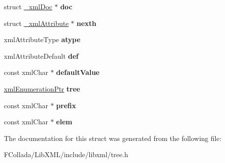 \begin{DoxyCompactItemize}
\item 
\hypertarget{struct__xmlAttribute_a9cc7df019f9b6bf88a263cddf8224351}{
struct \hyperlink{struct__xmlDoc}{\_\-xmlDoc} $\ast$ {\bfseries doc}}
\label{struct__xmlAttribute_a9cc7df019f9b6bf88a263cddf8224351}

\item 
\hypertarget{struct__xmlAttribute_ace58b06016a83e78f9030a3a734577ea}{
struct \hyperlink{struct__xmlAttribute}{\_\-xmlAttribute} $\ast$ {\bfseries nexth}}
\label{struct__xmlAttribute_ace58b06016a83e78f9030a3a734577ea}

\item 
\hypertarget{struct__xmlAttribute_ae3a8371d4d1d21b585c5d97895c3d6dd}{
xmlAttributeType {\bfseries atype}}
\label{struct__xmlAttribute_ae3a8371d4d1d21b585c5d97895c3d6dd}

\item 
\hypertarget{struct__xmlAttribute_a4e0cc0380fd2d2009bb2853e7c34423b}{
xmlAttributeDefault {\bfseries def}}
\label{struct__xmlAttribute_a4e0cc0380fd2d2009bb2853e7c34423b}

\item 
\hypertarget{struct__xmlAttribute_a1fd4cc9f458498c327f7fcc8730da01c}{
const xmlChar $\ast$ {\bfseries defaultValue}}
\label{struct__xmlAttribute_a1fd4cc9f458498c327f7fcc8730da01c}

\item 
\hypertarget{struct__xmlAttribute_a630c42587e233ede3bbbd2c8e29d5108}{
\hyperlink{struct__xmlEnumeration}{xmlEnumerationPtr} {\bfseries tree}}
\label{struct__xmlAttribute_a630c42587e233ede3bbbd2c8e29d5108}

\item 
\hypertarget{struct__xmlAttribute_a9b97bd921567b53ae625daa4ef849480}{
const xmlChar $\ast$ {\bfseries prefix}}
\label{struct__xmlAttribute_a9b97bd921567b53ae625daa4ef849480}

\item 
\hypertarget{struct__xmlAttribute_ac7911f56d58e8a476fd0a53bf529cf7e}{
const xmlChar $\ast$ {\bfseries elem}}
\label{struct__xmlAttribute_ac7911f56d58e8a476fd0a53bf529cf7e}

\end{DoxyCompactItemize}


The documentation for this struct was generated from the following file:\begin{DoxyCompactItemize}
\item 
FCollada/LibXML/include/libxml/tree.h\end{DoxyCompactItemize}
